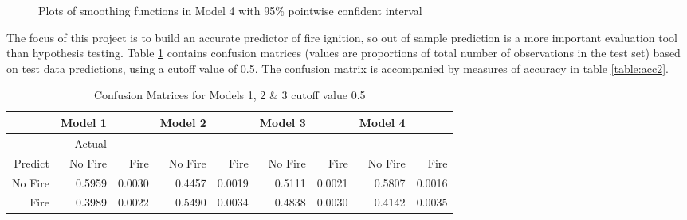 \documentclass{article}
\begin{document}
\begin{figure}[h]
\null\vfill\noindent
\hfill
\vfill
\hfill
\vfill
\hfill
\vfill
\null
	\caption{Plots of smoothing functions in Model 4 with 95\% pointwise confident interval} 
	\label{fig:gam_pl} 
\end{figure}

The focus of this project is to build an accurate predictor of fire ignition, so out of sample prediction is a more important evaluation tool than hypothesis testing. Table \ref{table:cm2} contains confusion matrices (values are proportions of total number of observations in the test set) based on test data predictions, using a cutoff value of 0.5. The confusion matrix is accompanied by measures of accuracy in table \ref{table:acc2}. 

\begin{table}[ht]
	\centering
	\begin{tabular}{r|rr|rr|rr|rr}
		\hline
		& Model 1 &  & Model 2 &  & Model 3 &  & Model 4 & \\ 
		\hline
		& Actual   &  &  &  &  & & & \\ 
		Predict & No Fire & Fire & No Fire & Fire & No Fire & Fire & No Fire & Fire\\ 
		\hline
No Fire & 0.5959 & 0.0030 & 0.4457 & 0.0019 & 0.5111 & 0.0021 & 0.5807 & 0.0016 \\ 
Fire & 0.3989 & 0.0022 & 0.5490 & 0.0034 & 0.4838 & 0.0030 & 0.4142 & 0.0035 \\ 
		\hline
	\end{tabular}
	\caption{Confusion Matrices for Models 1, 2 \& 3 cutoff value 0.5}
	\label{table:cm2}
\end{table}
\end{document}
